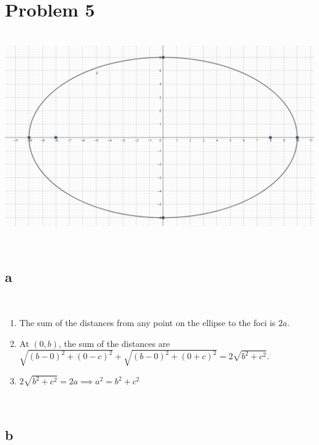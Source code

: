 \documentclass{article}
\begin{document}
\newpage

\section*{Problem 5}

~
\includegraphics[scale=0.3]{HW_0307/5.png}

~

\subsection*{a}

~

\begin{enumerate}
    \item The sum of the distances from any point on the ellipse to the foci is $2a$.
    \item At $(0,b)$, the sum of the distances are $\sqrt{(b-0)^2+(0-c)^2}+\sqrt{(b-0)^2+(0+c)^2}=2\sqrt{b^2+c^2}$.
    \item $2\sqrt{b^2+c^2}=2a\implies a^2=b^2+c^2$
\end{enumerate}

~

\subsection*{b}

~
\end{document}
